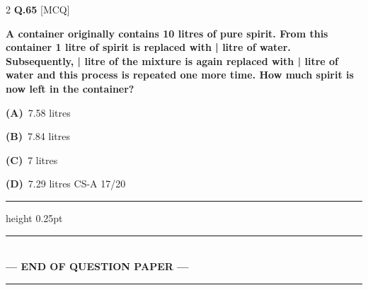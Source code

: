 \documentclass[a4paper,10pt,twoside]{article}
\begin{document}
\begin{multicols}{2}
\noindent\textbf{Q.65} \hfill {\footnotesize\textsf{[MCQ]}}
\par\vspace{2pt}
{\bfseries A container originally contains 10 litres of pure spirit. From this container 1 litre of spirit is
replaced with | litre of water. Subsequently, | litre of the mixture is again replaced with | litre of
water and this process is repeated one more time. How much spirit is now left in the container? \par}
\par\vspace{2pt}\noindent
\textbf{(A)}~7.58 litres\par\vspace{2pt}\noindent
\textbf{(B)}~7.84 litres\par\vspace{2pt}\noindent
\textbf{(C)}~7 litres\par\vspace{2pt}\noindent
\textbf{(D)}~7.29 litres \newline  \newline CS-A 17/20
\par\vspace{6pt}\hrule height 0.25pt\vspace{6pt}
\end{multicols}
\vspace{8pt}
\begin{center}
\rule{0.35\linewidth}{0.5pt}\\[2pt]
\textbf{\small --- END OF QUESTION PAPER ---}\\[-8pt]
\rule{0.35\linewidth}{0.5pt}
\end{center}
\vspace{10pt}
\end{document}

